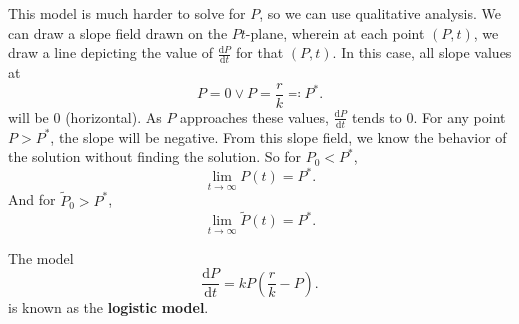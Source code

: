 This model is much harder to solve for $P$, so we can use qualitative analysis. We can draw a slope field drawn on the $Pt$-plane, wherein at each point $(P,t)$, we draw a line depicting the value of $\frac{\mathrm{d}P}{\mathrm{d}t} $ for that $(P,t)$. In this case, all slope values at
\[
	P=0\lor  P=\frac{r}{k}\eqqcolon P^*
.\]
will be $0$ (horizontal). As $P$ approaches these values, $\frac{\mathrm{d}P}{\mathrm{d}t} $ tends to $0$. For any point $P>P^*$, the slope will be negative. From this slope field, we know the behavior of the solution without finding the solution. So for $P_0<P^*$,
\[
	\lim_{t \to \infty} P(t)=P^*
.\]
And for $\tilde{P}_0>P^*$,
\[
	\lim_{t \to \infty} \tilde{P}(t)=P^*
.\]

\begin{remark}
	The model
	\[
		\frac{\mathrm{d}P}{\mathrm{d}t} =kP\left( \frac{r}{k}-P \right) 
	.\]
	is known as the \textbf{logistic} \textbf{model}.
\end{remark}
